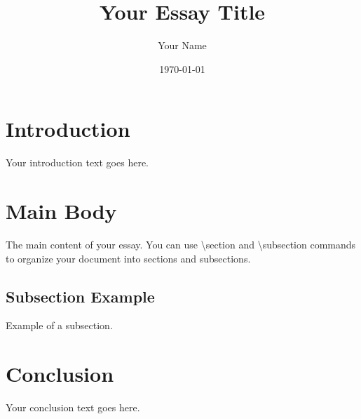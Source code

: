 \documentclass[11pt]{article}
\begin{document}
\title{Your Essay Title}
\author{Your Name}
\date{\today} %

\maketitle

\section{Introduction}
Your introduction text goes here. 

\section{Main Body}
The main content of your essay. You can use \textbackslash{}section and \textbackslash{}subsection commands to organize your document into sections and subsections.
\subsection{Subsection Example}
Example of a subsection.

\section{Conclusion}
Your conclusion text goes here.

%
\end{document}
